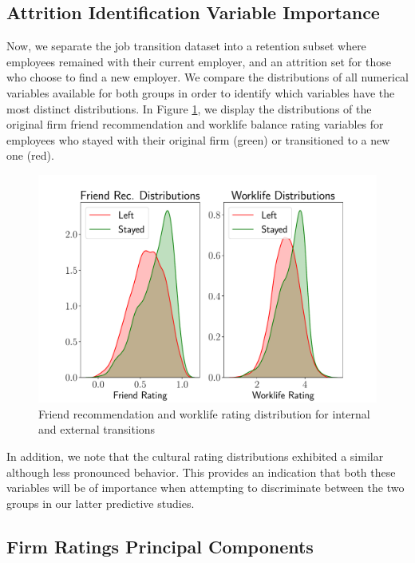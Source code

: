 \documentclass[10pt]{article}
\begin{document}
\subsection{Attrition Identification Variable Importance}

Now, we separate the job transition  dataset into a retention subset 
where employees remained with their current employer, and an attrition set for those who 
choose to find a new employer. We compare the distributions of all 
numerical variables available for both groups 
in order to identify which variables have the most distinct 
distributions.  In Figure \ref{fig:discdist}, we display the 
distributions of the original firm friend recommendation and 
worklife balance rating variables for employees who 
stayed with their original firm (green) or transitioned to a new one (red). 
%
\begin{figure}[thb]
    \centering
	\includegraphics[width=1.0\linewidth]{discdist.pdf}
	\caption{Friend recommendation and worklife rating distribution for internal 
    and external transitions}
	\label{fig:discdist}
\end{figure}
%
In addition, we note that the cultural rating distributions exhibited a similar 
although less pronounced behavior.  This provides an indication that both 
these variables will be of importance when attempting to discriminate between 
the two groups in our latter predictive studies. 

\subsection{Firm Ratings Principal Components}\label{pcasec}
\end{document}

